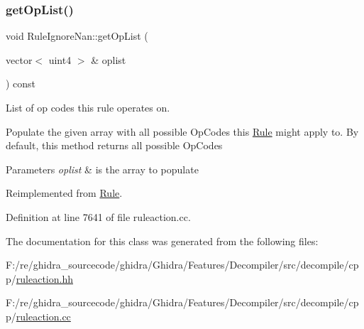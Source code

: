 \subsubsection{\texorpdfstring{getOpList()}{getOpList()}}
{\footnotesize\ttfamily void Rule\+Ignore\+Nan\+::get\+Op\+List (\begin{DoxyParamCaption}\item[{vector$<$ uint4 $>$ \&}]{oplist }\end{DoxyParamCaption}) const\hspace{0.3cm}{\ttfamily [virtual]}}



List of op codes this rule operates on. 

Populate the given array with all possible Op\+Codes this \mbox{\hyperlink{class_rule}{Rule}} might apply to. By default, this method returns all possible Op\+Codes 
\begin{DoxyParams}{Parameters}
{\em oplist} & is the array to populate \\
\hline
\end{DoxyParams}


Reimplemented from \mbox{\hyperlink{class_rule_a4023bfc7825de0ab866790551856d10e}{Rule}}.



Definition at line 7641 of file ruleaction.\+cc.



The documentation for this class was generated from the following files\+:\begin{DoxyCompactItemize}
\item 
F\+:/re/ghidra\+\_\+sourcecode/ghidra/\+Ghidra/\+Features/\+Decompiler/src/decompile/cpp/\mbox{\hyperlink{ruleaction_8hh}{ruleaction.\+hh}}\item 
F\+:/re/ghidra\+\_\+sourcecode/ghidra/\+Ghidra/\+Features/\+Decompiler/src/decompile/cpp/\mbox{\hyperlink{ruleaction_8cc}{ruleaction.\+cc}}\end{DoxyCompactItemize}
